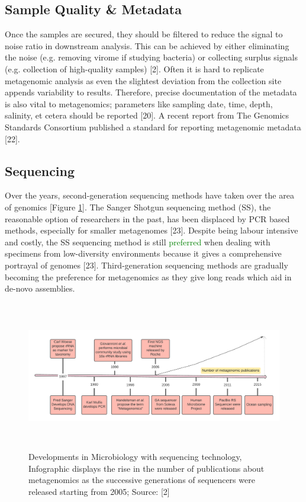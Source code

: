 \subsection{Sample Quality \& Metadata}
Once the samples are secured, they should be filtered to reduce the signal to noise ratio in downstream analysis. This can be achieved by either eliminating the noise (e.g. removing virome if studying bacteria) or collecting surplus signals (e.g. collection of high-quality samples) [2]. Often it is hard to replicate metagenomic analysis as even the slightest deviation from the collection site appends variability to results. Therefore, precise documentation of the metadata is also vital to metagenomics; parameters like sampling date, time, depth, salinity, et cetera should be reported [20]. A recent report from The Genomics Standards Consortium published a standard for reporting metagenomic metadata [22].

\subsection{Sequencing}
Over the years, second-generation sequencing methods have taken over the area of genomics [Figure \ref{fig:figure2}]. The Sanger Shotgun sequencing method (SS), the reasonable option of researchers in the past, has been displaced by PCR based methods, especially for smaller metagenomes [23]. Despite being labour intensive and costly, the SS sequencing method is still \textcolor{green}{preferred} when dealing with specimens from low-diversity environments because it gives a comprehensive portrayal of genomes [23]. Third-generation sequencing methods are gradually becoming the preference for metagenomics as they give long reads which aid in de-novo assemblies.

\begin{figure}
  \centering
  \includegraphics[width=15cm, height=6.5cm]{../figures/Figure2.png}
  \caption{Developments in Microbiology with sequencing technology, Infographic displays the rise in the number of publications about metagenomics as the successive generations of sequencers were released starting from 2005; Source: [2]}
  \label{fig:figure2}
\end{figure}

